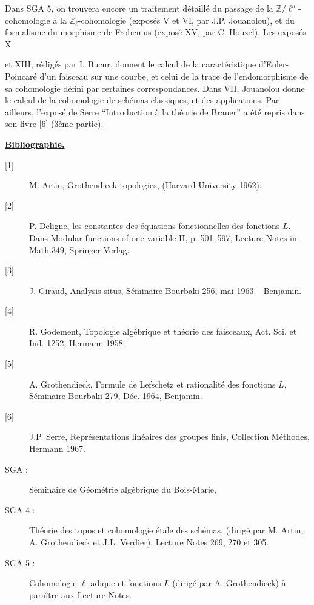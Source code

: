 Dans SGA 5, on trouvera encore un traitement détaillé du passage de la
$\mathbb Z/\ell^n$-cohomologie à la $\mathbb Z_\ell$-cohomologie (exposés V et
VI, par J.P. Jouanolou), et du formalisme du morphisme de Frobenius (exposé XV,
par C. Houzel). Les exposés X


et XIII, rédigés par I. Bucur, donnent le calcul de la caractéristique
d'Euler-Poincaré d'un faisceau sur une courbe, et celui de la trace de
l'endomorphisme de sa cohomologie défini par certaines correspondances. Dans
VII, Jouanolou donne le calcul de la cohomologie de schémas classiques, et des
applications. Par ailleurs, l'exposé de Serre ``Introduction à la théorie de
Brauer'' a été repris dans son livre [6] (3ème partie).

\begin{center}
\textbf{\underline{Bibliographie.}}
\end{center}

\begin{description}
\item[{[1]}] M. Artin, Grothendieck topologies, (Harvard University 1962).
\item[{[2]}] P. Deligne, les constantes des équations fonctionnelles des
fonctions $L$. Dans Modular functions of one variable II, p. 501--597, Lecture
Notes in Math.349, Springer Verlag.
\item[{[3]}] J. Giraud, Analysis situs, Séminaire Bourbaki 256, mai 1963 --
Benjamin.
\item[{[4]}] R. Godement, Topologie algébrique et théorie des faisceaux, Act.
Sci. et Ind. 1252, Hermann 1958.
\item[{[5]}] A. Grothendieck, Formule de Lefschetz et rationalité des fonctions
$L$, Séminaire Bourbaki 279, Déc. 1964, Benjamin.
\item[{[6]}] J.P. Serre, Représentations linéaires des groupes finis,
Collection Méthodes, Hermann 1967.
\end{description}

\begin{description}
\item[SGA :] Séminaire de Géométrie algébrique du Bois-Marie,
\item[SGA 4 :] Théorie des topos et cohomologie étale des schémas, (dirigé par
M. Artin, A. Grothendieck et J.L. Verdier). Lecture Notes 269, 270 et 305.
\item[SGA 5 :] Cohomologie $\ell$-adique et fonctions $L$ (dirigé par A.
Grothendieck) à paraître aux Lecture Notes.
\end{description}

